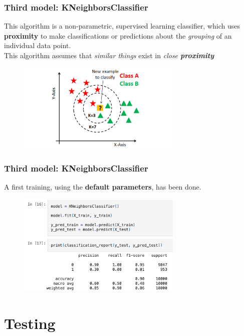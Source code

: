 \documentclass{beamer}
\begin{document}
\begin{frame}
\frametitle{Third model: \textbf{KNeighborsClassifier}}
This algorithm is a non-parametric, supervised learning classifier, which uses \textbf{proximity} to make classifications or predictions about the \textit{grouping} of an individual data point.\\
This algorithm assumes that \textit{similar things} exist in \textit{close \textbf{proximity}}
\begin{figure}
\centering
    \includegraphics[width=0.7\textwidth]{imgs/knn.png}
    \label{fig:knn}
\end{figure}
\end{frame}

\begin{frame}
\frametitle{Third model: \textbf{KNeighborsClassifier}}
A first training, using the \textbf{default parameters}, has been done.
\begin{figure}
\centering
    \includegraphics[width=0.7\textwidth]{imgs/knn_code.png}
    \label{fig:knn_code}
\end{figure}
\end{frame}


\section{Testing}
\end{document}
